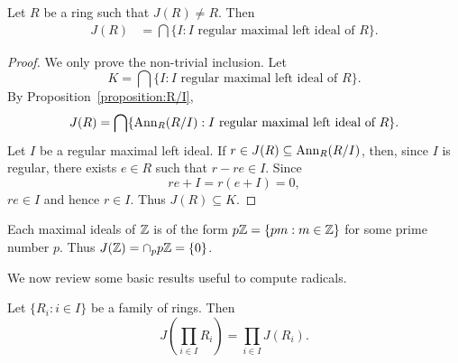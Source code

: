 %

\begin{theorem}
	\label{thm:J(R)}
	Let $R$ be a ring such that $J(R)\ne R$. Then 
	\begin{align*}
		J(R)&=\bigcap\{I:\text{$I$ regular maximal left ideal of $R$}\}.
	\end{align*}
\end{theorem}

\begin{proof}
    We only prove the non-trivial inclusion. 
	Let 
	\[
	K=\bigcap\{I:\text{$I$ regular maximal left ideal of $R$}\}.
	\]
	By
	Proposition~\ref{proposition:R/I}, 
	\[
		J(R)=\bigcap\{\operatorname{Ann}_R(R/I):I\text{ regular maximal left ideal of $R$}\}.
	\]
	Let $I$ be a regular maximal left ideal. If $r\in J(R)\subseteq
	\operatorname{Ann}_R(R/I)$, then, since $I$ is regular, there exists $e\in R$ such that
	$r-re\in I$. Since 
	\[
	re+I=r(e+I)=0,
	\]
	$re\in I$ and hence $r\in I$. Thus $J(R)\subseteq K$. 
\end{proof}

\begin{example}
	Each maximal ideals of $\mathbb{Z}$ is of the form $p\mathbb{Z}=\{pm:m\in\mathbb{Z}\}$ for some prime number $p$. 
	Thus $J(\mathbb{Z})=\cap_p p\mathbb{Z}=\{0\}$.
\end{example}




We now review some basic results useful to compute radicals. 

\begin{proposition}
	Let $\{R_i:i\in I\}$ be a family of rings. Then 
	\[
	J\left(\prod_{i\in I}R_i\right)=\prod_{i\in I}J(R_i).
	\]
\end{proposition}

